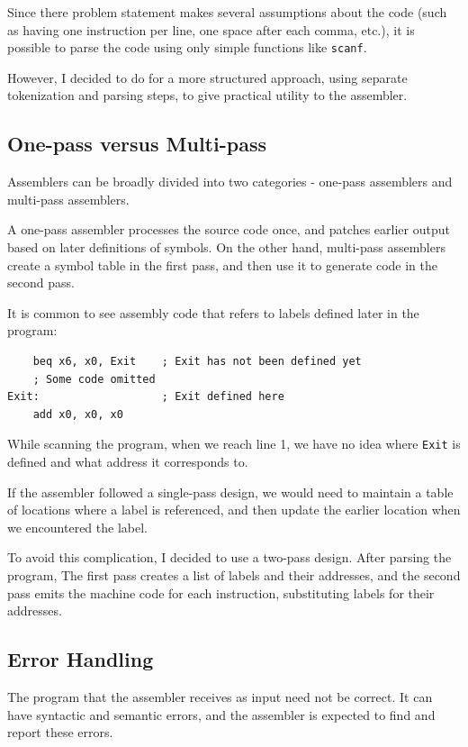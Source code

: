 \documentclass{article}
\begin{document}
Since there problem statement makes several assumptions about the code (such
as having one instruction per line, one space after each comma, etc.), it is possible
to parse the code using only simple functions like \texttt{scanf}.

However, I decided to do for a more structured approach, using separate tokenization
and parsing steps, to give practical utility to the assembler.

\subsection{One-pass versus Multi-pass}

Assemblers can be broadly divided into two categories - one-pass assemblers and
multi-pass assemblers.

A one-pass assembler processes the source code once, and patches earlier output
based on later definitions of symbols. On the other hand, multi-pass assemblers
create a symbol table in the first pass, and then use it to generate code in the 
second pass.

It is common to see assembly code that refers to labels defined later in the program:

\begin{verbatim}
    beq x6, x0, Exit    ; Exit has not been defined yet
    ; Some code omitted
Exit:                   ; Exit defined here
    add x0, x0, x0
\end{verbatim}

While scanning the program, when we reach line 1, we have no idea where \texttt{Exit}
is defined and what address it corresponds to.

If the assembler followed a single-pass design, we would need to maintain a table of locations
where a label is referenced, and then update the earlier location when we encountered the label.

To avoid this complication, I decided to use a two-pass design. After parsing the program,
The first pass creates a list of labels and their addresses, and the second pass emits
the machine code for each instruction, substituting labels for their addresses. 

\subsection{Error Handling}

The program that the assembler receives as input need not be correct. It can have syntactic
and semantic errors, and the assembler is expected to find and report these errors.
\end{document}
